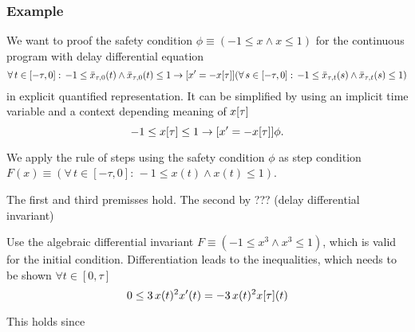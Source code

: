 \documentclass[10pt]{article}
\begin{document}
        \subsubsection{Example}
            \label{sec:example}
            We want to proof the safety condition $\phi\equiv(-1\leq x\wedge x\leq 1)$ for the continuous program with delay differential equation
            \begin{equation}
                \forall\,t\in[-\tau,0]:\,-1\leq\bar{x}_{\tau,0}(t)\wedge\bar{x}_{\tau,0}(t)\leq 1
                \rightarrow
                [x'=-x[\tau]] (\forall\,s\in[-\tau,0]:\,-1\leq\bar{x}_{\tau,t}(s)\wedge\bar{x}_{\tau,t}(s)\leq 1)
            \end{equation}
            in explicit quantified representation. It can be simplified by using an implicit time variable and a context depending meaning of $x[\tau]$
            \begin{equation}
                -1\leq x[\tau]\leq 1 \rightarrow [x'=-x[\tau]]\phi.
            \end{equation}

            We apply the rule of steps using the safety condition $\phi$ as step condition $F(x)\equiv(\forall\,t\in[-\tau,0]:\,-1\leq x(t)\wedge x(t)\leq 1)$.

            The first and third premisses hold. The second by ??? (delay differential invariant)

            Use the algebraic differential invariant $F\equiv(-1\leq x^3\wedge x^3\leq1)$, which is valid for the initial condition. Differentiation leads to the inequalities, which needs to be shown $\forall t\in[0,\tau]$
            \begin{equation}
                0\leq 3\,x(t)^2 x'(t) = -3\,x(t)^2 x[\tau](t)
            \end{equation}

            This holds since



\nocite{*}


\end{document}
